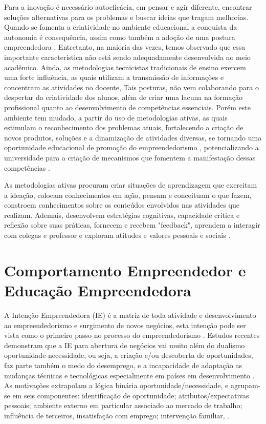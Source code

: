 Para a inovação é necessário autoeficácia, em pensar e agir diferente, encontrar soluções alternativas para os problemas e buscar ideias que tragam melhorias. Quando se fomenta a criatividade no ambiente educacional a conquista da autonomia é consequência, assim como também a adoção de uma postura empreendedora \cite{gonzalez_predictors_2009}. Entretanto, na maioria das vezes, temos observado que essa importante característica não está sendo adequadamente desenvolvida no meio acadêmico. Ainda, as metodologias tecnicistas tradicionais de ensino exercem uma forte influência, as quais utilizam a transmissão de informações e concentram as atividades no docente, Tais posturas, não vem colaborando para o despertar da criatividade dos alunos, além de criar uma lacuna na formação profissional quanto ao desenvolvimento de competências essenciais. Porém este ambiente tem mudado, a partir do uso de metodologias ativas, as quais estimulam o reconhecimento dos problemas atuais, fortalecendo a criação de novos produtos, soluções e a dinamização de atividades diversas, se tornando uma oportunidade educacional de promoção do empreendedorismo \cite{faria_promocao_2018}, potencializando a universidade para a criação de mecanismos que fomentem a manifestação dessas competências \cite{audy_innovation_2006}.

As metodologias ativas procuram criar situações de aprendizagem que exercitam a ideação, colocam conhecimentos em ação, pensam e conceituam o que fazem, constroem conhecimentos sobre os conteúdos envolvidos nas atividades que realizam. Ademais, desenvolvem estratégias cognitivas, capacidade crítica e reflexão sobre suas práticas, fornecem e recebem "feedback", aprendem a interagir com colegas e professor e exploram atitudes e valores pessoais e sociais \cite{berbel_as_2011}. 

\section{Comportamento Empreendedor e Educação Empreendedora}


A Intenção Empreendedora (IE) é a matriz de toda atividade e desenvolvimento ao empreendedorismo e surgimento de novos negócios, esta intenção pode ser vista como o primeiro passo no processo do empreendedorismo \cite{zhao_relationship_2010, shirokova_exploring_2016}. Estudos recentes demonstram que a IE para abertura de negócios vai muito além do dualismo oportunidade-necessidade, ou seja, a criação e/ou descoberta de oportunidades, faz parte também o medo do desemprego, e a incapacidade de adaptação as mudanças técnicas e tecnológicas especialmente em países em desenvolvimento \cite{vale_motivacoes_2014}. As motivações extrapolam a lógica binária oportunidade/necessidade, e agrupam-se em seis componentes: identificação de oportunidade; atributos/expectativas pessoais; ambiente externo em particular associado ao mercado de trabalho; influência de terceiros, insatisfação com emprego; intervenção familiar, \cite{vale_motivacoes_2014, rodrigues_intencao_2019,ferreira_intencao_2017}.


